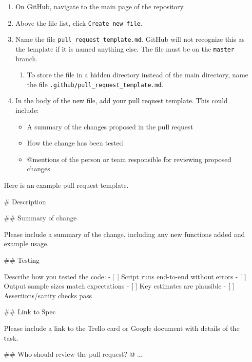 \documentclass[
]{book}
\newenvironment{Shaded}{\begin{snugshade}}{\end{snugshade}}
\newcommand{\NormalTok}[1]{#1}
\providecommand{\tightlist}{%
  \setlength{\itemsep}{0pt}\setlength{\parskip}{0pt}}
\begin{document}
\begin{enumerate}
\def\labelenumi{\arabic{enumi}.}
\tightlist
\item
  On GitHub, navigate to the main page of the repository.
\item
  Above the file list, click \texttt{Create\ new\ file}.
\item
  Name the file \texttt{pull\_request\_template.md}. GitHub will not recognize this as the template if it is named anything else. The file must be on the \texttt{master} branch.

  \begin{enumerate}
  \def\labelenumii{\arabic{enumii}.}
  \tightlist
  \item
    To store the file in a hidden directory instead of the main directory, name the file \texttt{.github/pull\_request\_template.md}.
  \end{enumerate}
\item
  In the body of the new file, add your pull request template. This could include:

  \begin{itemize}
  \tightlist
  \item
    A summary of the changes proposed in the pull request
  \item
    How the change has been tested
  \item
    @mentions of the person or team responsible for reviewing proposed changes
  \end{itemize}
\end{enumerate}

Here is an example pull request template.

\begin{Shaded}
\begin{Highlighting}[]
\NormalTok{\# Description}

\NormalTok{\#\# Summary of change}

\NormalTok{Please include a summary of the change, including any new functions added and example usage. }

\NormalTok{\#\# Testing}

\NormalTok{Describe how you tested the code:}
\NormalTok{{-} [ ] Script runs end{-}to{-}end without errors}
\NormalTok{{-} [ ] Output sample sizes match expectations}
\NormalTok{{-} [ ] Key estimates are plausible}
\NormalTok{{-} [ ] Assertions/sanity checks pass}

\NormalTok{\#\# Link to Spec}

\NormalTok{Please include a link to the Trello card or Google document with details of the task. }

\NormalTok{\#\# Who should review the pull request?}
\NormalTok{@ ...}
\end{Highlighting}
\end{Shaded}
\end{document}
